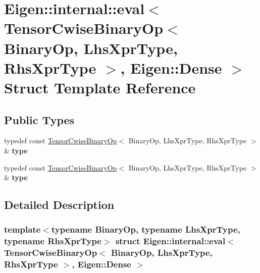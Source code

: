 \hypertarget{struct_eigen_1_1internal_1_1eval_3_01_tensor_cwise_binary_op_3_01_binary_op_00_01_lhs_xpr_type_07911fe375dfab05cfcedb209a79e59fe}{}\section{Eigen\+:\+:internal\+:\+:eval$<$ Tensor\+Cwise\+Binary\+Op$<$ Binary\+Op, Lhs\+Xpr\+Type, Rhs\+Xpr\+Type $>$, Eigen\+:\+:Dense $>$ Struct Template Reference}
\label{struct_eigen_1_1internal_1_1eval_3_01_tensor_cwise_binary_op_3_01_binary_op_00_01_lhs_xpr_type_07911fe375dfab05cfcedb209a79e59fe}
\subsection*{Public Types}
\begin{DoxyCompactItemize}
\item 
\mbox{\label{struct_eigen_1_1internal_1_1eval_3_01_tensor_cwise_binary_op_3_01_binary_op_00_01_lhs_xpr_type_07911fe375dfab05cfcedb209a79e59fe_ad9a204c7068eec62ce4d043ea3497acb}} 
typedef const \hyperlink{class_eigen_1_1_tensor_cwise_binary_op}{Tensor\+Cwise\+Binary\+Op}$<$ Binary\+Op, Lhs\+Xpr\+Type, Rhs\+Xpr\+Type $>$ \& {\bfseries type}
\item 
\mbox{\label{struct_eigen_1_1internal_1_1eval_3_01_tensor_cwise_binary_op_3_01_binary_op_00_01_lhs_xpr_type_07911fe375dfab05cfcedb209a79e59fe_ad9a204c7068eec62ce4d043ea3497acb}} 
typedef const \hyperlink{class_eigen_1_1_tensor_cwise_binary_op}{Tensor\+Cwise\+Binary\+Op}$<$ Binary\+Op, Lhs\+Xpr\+Type, Rhs\+Xpr\+Type $>$ \& {\bfseries type}
\end{DoxyCompactItemize}


\subsection{Detailed Description}
\subsubsection*{template$<$typename Binary\+Op, typename Lhs\+Xpr\+Type, typename Rhs\+Xpr\+Type$>$\newline
struct Eigen\+::internal\+::eval$<$ Tensor\+Cwise\+Binary\+Op$<$ Binary\+Op, Lhs\+Xpr\+Type, Rhs\+Xpr\+Type $>$, Eigen\+::\+Dense $>$}



